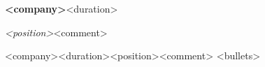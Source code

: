 \if\relax{}\relax
  \textbf{<company>}\hfill <duration>\par
  \textit{<position>}<comment>\par
\else
  \begin{myrSubsection}{<company>}{<duration>}{<position><comment>}
<bullets>  \end{myrSubsection}
\fi
